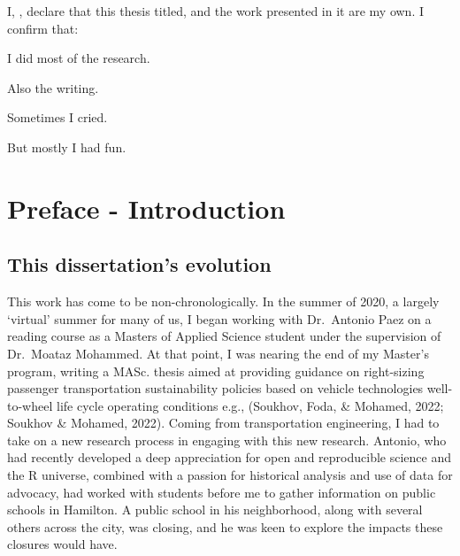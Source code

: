 \documentclass[
11pt, %
oneside, %
english, %
singlespacing, %
]{macthesis} %
\begin{document}
\begin{declaration}
\addchaptertocentry{\authorshipname}

\noindent I, \authorname, declare that this thesis titled, \emph{\ttitle} and the work presented in it are my own. I confirm that:

I did most of the research.

Also the writing.

Sometimes I cried.

But mostly I had fun.

\end{declaration}


\label{lastoffront}
\clearpage


\mainmatter %
\pagestyle{thesis}
\chapter*{Preface - Introduction}\label{preface---introduction}

\section{This dissertation's evolution}\label{this-dissertations-evolution}

This work has come to be non-chronologically. In the summer of 2020, a largely `virtual' summer for many of us, I began working with Dr.~Antonio Paez on a reading course as a Masters of Applied Science student under the supervision of Dr.~Moataz Mohammed. At that point, I was nearing the end of my Master's program, writing a MASc. thesis aimed at providing guidance on right-sizing passenger transportation sustainability policies based on vehicle technologies well-to-wheel life cycle operating conditions e.g., (Soukhov, Foda, \& Mohamed, 2022; Soukhov \& Mohamed, 2022). Coming from transportation engineering, I had to take on a new research process in engaging with this new research. Antonio, who had recently developed a deep appreciation for open and reproducible science and the R universe, combined with a passion for historical analysis and use of data for advocacy, had worked with students before me to gather information on public schools in Hamilton. A public school in his neighborhood, along with several others across the city, was closing, and he was keen to explore the impacts these closures would have.
\end{document}
